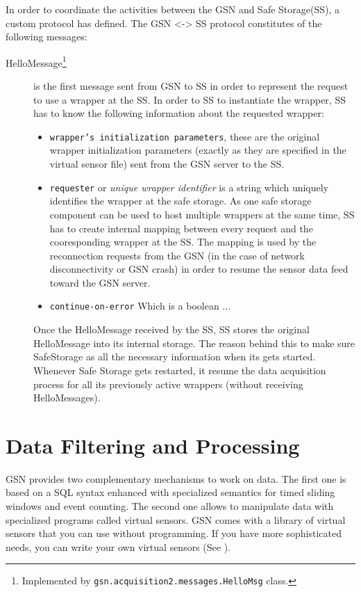 In order to coordinate the activities between the GSN and Safe Storage(SS), a custom protocol has defined. The GSN <-> SS protocol 
constitutes of the following messages:
\begin{description}
	\item[HelloMessage\footnote{Implemented by \texttt{gsn.acquisition2.messages.HelloMsg} class.}] is the first message sent from GSN to SS in order to represent the request to use a wrapper at the SS. In order to SS to instantiate the wrapper, SS has to know the following
	information about the requested wrapper:
	\begin{itemize}
		\item \texttt{wrapper's initialization parameters}, these are the original wrapper initialization parameters (exactly as they are specified in the virtual sensor file) sent from the GSN server to the SS. 
		\item \texttt{requester} or \emph{unique wrapper identifier} is a string which uniquely identifies the wrapper at the safe storage. As one safe storage component can be used to host multiple wrappers at the same time, SS has to create internal mapping between every request
		and the cooresponding wrapper at the SS. The mapping is used by the reconnection requests from the GSN (in the case of network disconnectivity or GSN crash) in order to resume the sensor data feed toward the GSN server.
		\item \texttt{continue-on-error} Which is a boolean ...
	\end{itemize}
	Once the HelloMessage received by the SS, SS stores the original HelloMessage into its internal storage. The reason behind this to 
	make sure SafeStorage as all the necessary information when its gets started. Whenever Safe Storage gets restarted, it resume the
	data acquisition process for all its previously active wrappers (without receiving HelloMessages).
\end{description}

\section{Data Filtering and Processing}

GSN provides two complementary mechanisms to work on data.
The first one is based on a SQL syntax enhanced with specialized semantics
for timed sliding windows and event counting.
The second one allows to manipulate data with specialized programs called
virtual sensors. GSN comes with a library of virtual sensors that you can use
without programming. If you have more sophisticated needs, you can write your
own virtual sensors (See ).

